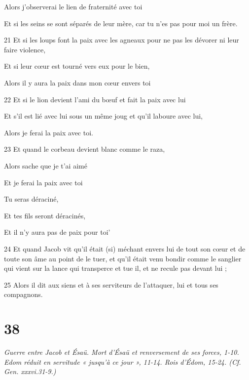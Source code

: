 \par     Alors j'observerai le lien de fraternité avec toi  
\par     Et si les seins se sont séparés de leur mère, car tu n'es pas pour moi un frère.  
\par    
\par 21 Et si les loups font la paix avec les agneaux pour ne pas les dévorer ni leur faire violence,  
\par     Et si leur cœur est tourné vers eux pour le bien,  
\par     Alors il y aura la paix dans mon cœur envers toi
\par    
\par 22 Et si le lion devient l'ami du bœuf et fait la paix avec lui  
\par     Et s’il est lié avec lui sous un même joug et qu’il laboure avec lui,  
\par     Alors je ferai la paix avec toi.  
\par    
\par 23 Et quand le corbeau devient blanc comme le raza,  
\par     Alors sache que je t'ai aimé  
\par     Et je ferai la paix avec toi  
\par     Tu seras déraciné,  
\par     Et tes fils seront déracinés,  
\par     Et il n'y aura pas de paix pour toi'
\par    
\par 24 Et quand Jacob vit qu'il était (si) méchant envers lui de tout son cœur et de toute son âme au point de le tuer, et qu'il était venu bondir comme le sanglier qui vient sur la lance qui transperce et tue il, et ne recule pas devant lui ;
\par 25 Alors il dit aux siens et à ses serviteurs de l'attaquer, lui et tous ses compagnons.

\chapter{38}

\par \textit{Guerre entre Jacob et Ésaü. Mort d'Ésaü et renversement de ses forces, 1-10. Edom réduit en servitude « jusqu'à ce jour », 11-14. Rois d'Édom, 15-24. (Cf. Gen. xxxvi.31-9.)}

